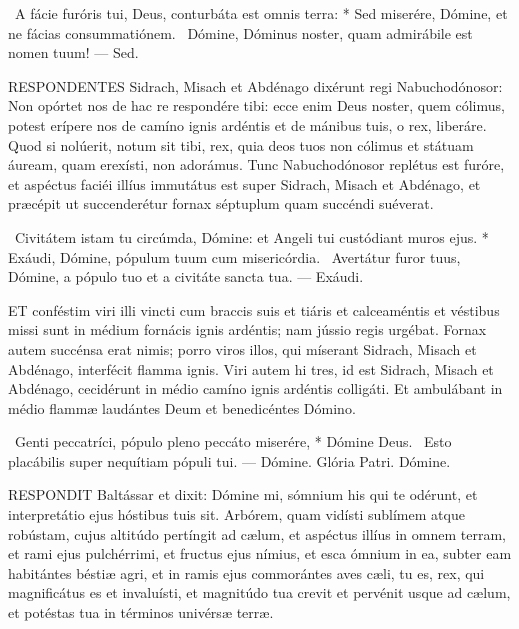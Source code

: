 \R\ A fácie furóris tui, Deus, conturbáta est omnis terra: * Sed miserére, Dómine, et ne fácias consummatiónem. \V\ Dómine, Dóminus noster, quam admirábile est nomen tuum! — Sed.


\lettrine[lines=2]{R}{ESPONDENTES} Sidrach, Misach et Abdénago dixérunt regi Nabuchodónosor: Non opórtet nos de hac re respondére tibi: ecce enim Deus noster, quem cólimus, potest erípere nos de camíno ignis ardéntis et de mánibus tuis, o rex, liberáre. Quod si nolúerit, notum sit tibi, rex, quia deos tuos non cólimus et státuam áuream, quam erexísti, non adorámus. Tunc Nabuchodónosor replétus est furóre, et aspéctus faciéi illíus immutátus est super Sidrach, Misach et Abdénago, et præcépit ut succenderétur fornax séptuplum quam succéndi suéverat.

\R\ Civitátem istam tu circúmda, Dómine: et Angeli tui custódiant muros ejus. * Exáudi, Dómine, pópulum tuum cum misericórdia. \V\ Avertátur furor tuus, Dómine, a pópulo tuo et a civitáte sancta tua. — Exáudi.



\lettrine[lines=2]{E}{T} conféstim viri illi vincti cum braccis suis et tiáris et calceaméntis et véstibus missi sunt in médium fornácis ignis ardéntis; nam jússio regis urgébat. Fornax autem succénsa erat nimis; porro viros illos, qui míserant Sidrach, Misach et Abdénago, interfécit flamma ignis. Viri autem hi tres, id est Sidrach, Misach et Abdénago, cecidérunt in médio camíno ignis ardéntis colligáti. Et ambulábant in médio flammæ laudántes Deum et benedicéntes Dómino.

\R\ Genti peccatríci, pópulo pleno peccáto miserére, * Dómine Deus. \V\ Esto placábilis super nequítiam pópuli tui. — Dómine. Glória Patri. Dómine.




\lettrine[lines=2]{R}{ESPONDIT} Baltássar et dixit: Dómine mi, sómnium his qui te odérunt, et interpretátio ejus hóstibus tuis sit. Arbórem, quam vidísti sublímem atque robústam, cujus altitúdo pertíngit ad cælum, et aspéctus illíus in omnem terram, et rami ejus pulchérrimi, et fructus ejus nímius, et esca ómnium in ea, subter eam habitántes béstiæ agri, et in ramis ejus commorántes aves cæli, tu es, rex, qui magnificátus es et invaluísti, et magnitúdo tua crevit et pervénit usque ad cælum, et potéstas tua in términos univérsæ terræ.

